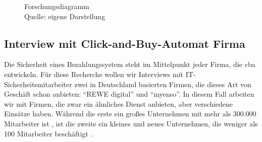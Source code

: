 \begin{figure}[H]
  \caption{Forschungsdiagramm
  \\ Quelle: eigene Darstellung}
  \label{fig:FD}
\end{figure}



\subsection{Interview mit Click-and-Buy-Automat Firma}

Die Sicherheit eines Bezahlungssystem steht im Mittelpunkt jeder Firma, die \acrfull{cba} entwickeln. 
Für diese Recherche wollen wir Interviews mit IT-Sicherheitsmitarbeiter zwei in Deutschland basierten Firmen, 
die dieses Art von Geschäft schon anbieten: ``REWE digital'' und ``myenso''. In diesem Fall arbeiten wir mit Firmen, 
die zwar ein ähnliches Dienst anbieten, aber verschiedene Einsätze haben. Während die erste ein großes Unternehmen
mit mehr als 300.000 Mitarbeiter ist \cite{refst:REWE}, ist die zweite ein kleines und neues Unternehmen, die weniger
als 100 Mitarbeiter beschäftigt \cite{refst:MYENSO}.

